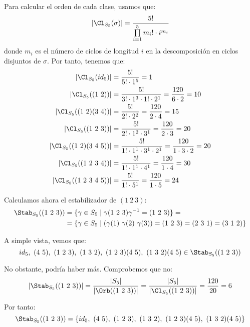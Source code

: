 \begin{ejercicio}
    Para calcular el orden de cada clase, usamos que:
    \begin{equation*}
        |\Cl_{S_5}(\sigma)| = \dfrac{5!}{\prod\limits_{i=1}^5 m_i! \cdot i^{m_i}}
    \end{equation*}
    donde $m_i$ es el número de ciclos de longitud $i$ en la descomposición en ciclos disjuntos de $\sigma$. Por tanto, tenemos que:
    \begin{align*}
        |\Cl_{S_5}(id_5)| &= \dfrac{5!}{5! \cdot 1^5} = 1\\
        |\Cl_{S_5}((1\ 2))| &= \dfrac{5!}{3!\cdot 1^3 \cdot 1!\cdot 2^1} = \dfrac{120}{6\cdot 2} = 10\\
        |\Cl_{S_5}((1\ 2)(3\ 4))| &= \dfrac{5!}{2!\cdot 2^2} = \dfrac{120}{2\cdot 4} = 15\\
        |\Cl_{S_5}((1\ 2\ 3))| &= \dfrac{5!}{2!\cdot 1^2 \cdot 3^1} = \dfrac{120}{2\cdot 3} = 20\\
        |\Cl_{S_5}((1\ 2)(3\ 4\ 5))| &= \dfrac{5!}{1!\cdot 1^1 \cdot 3^1 \cdot 2^1} = \dfrac{120}{1\cdot 3\cdot 2} = 20\\
        |\Cl_{S_5}((1\ 2\ 3\ 4))| &= \dfrac{5!}{1!\cdot 1^1 \cdot 4^1} = \dfrac{120}{1\cdot 4} = 30\\
        |\Cl_{S_5}((1\ 2\ 3\ 4\ 5))| &= \dfrac{5!}{1!\cdot 5^1} = \dfrac{120}{1\cdot 5} = 24
    \end{align*}


    Calculamos ahora el estabilizador de $(1\ 2\ 3)$:
    \begin{align*}
        \Stab_{S_5}((1\ 2\ 3)) &= \{\gamma\in S_5\mid \gamma(1\ 2\ 3)\gamma^{-1} = (1\ 2\ 3)\}
        =\\&= \{\gamma\in S_5\mid (\gamma(1)\ \gamma(2)\ \gamma(3)) = (1\ 2\ 3) = (2\ 3\ 1) = (3\ 1\ 2)\}
    \end{align*}

    A simple vista, vemos que:
    \begin{equation*}
        id_5,\ (4\ 5),\ (1\ 2\ 3),\ (1\ 3\ 2),\ (1\ 2\ 3)(4\ 5),\ (1\ 3\ 2)(4\ 5)\in \Stab_{S_5}((1\ 2\ 3))
    \end{equation*}

    No obstante, podría haber más. Comprobemos que no:
    \begin{equation*}
        |\Stab_{S_5}((1\ 2\ 3))| = \dfrac{|S_5|}{|\Orb((1\ 2\ 3))|}= \dfrac{|S_5|}{|\Cl_{S_5}((1\ 2\ 3))|}
        = \dfrac{120}{20} = 6
    \end{equation*}

    Por tanto:
    \begin{equation*}
        \Stab_{S_5}((1\ 2\ 3))=\{id_5,\ (4\ 5),\ (1\ 2\ 3),\ (1\ 3\ 2),\ (1\ 2\ 3)(4\ 5),\ (1\ 3\ 2)(4\ 5)\}
    \end{equation*}
\end{ejercicio}


